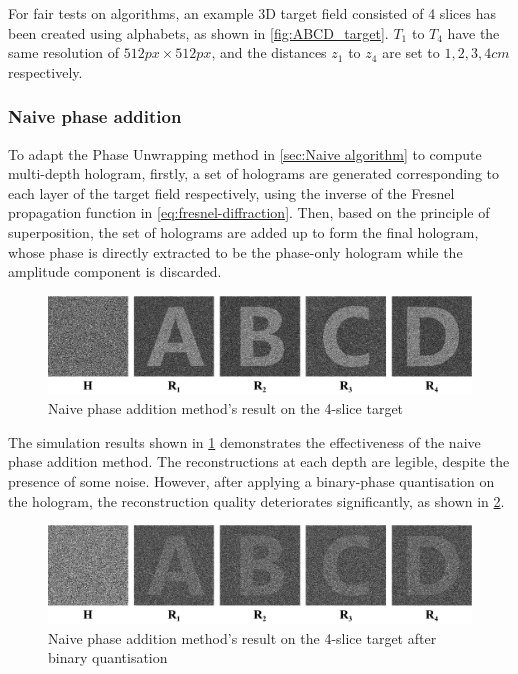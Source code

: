 For fair tests on algorithms, an example 3D target field consisted of 4 slices has been created using alphabets, as shown in \cref{fig:ABCD_target}. $T_1$ to $T_4$ have the same resolution of $512px \times 512px$, and the distances $z_1$ to $z_4$ are set to $1, 2, 3, 4 cm$ respectively.


\subsubsection{Naive phase addition}
To adapt the Phase Unwrapping method in \cref{sec:Naive algorithm} to compute multi-depth hologram, firstly, a set of holograms are generated corresponding to each layer of the target field respectively, using the inverse of the Fresnel propagation function in \cref{eq:fresnel-diffraction}. Then, based on the principle of superposition, the set of holograms are added up to form the final hologram, whose phase is directly extracted to be the phase-only hologram while the amplitude component is discarded.

\begin{figure}[H]
	\centering
	\includegraphics[width=1.0\textwidth]{ABCD/Naive_ABCD.pdf}
	\caption{Naive phase addition method's result on the 4-slice target}
	\label{fig:Naive_ABCD}
\end{figure}

The simulation results shown in \cref{fig:Naive_ABCD} demonstrates the effectiveness of the naive phase addition method. The reconstructions at each depth are legible, despite the presence of some noise. However, after applying a binary-phase quantisation on the hologram, the reconstruction quality deteriorates significantly, as shown in \cref{fig:Naive_ABCD_binary}.

\begin{figure}[H]
	\centering
	\includegraphics[width=1.0\textwidth]{ABCD/Naive_ABCD_binary.pdf}
	\caption{Naive phase addition method's result on the 4-slice target after binary quantisation}
	\label{fig:Naive_ABCD_binary}
\end{figure}

